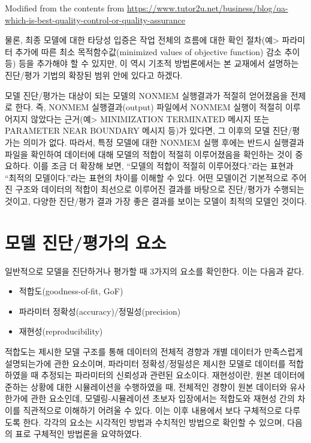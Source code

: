 \documentclass[
  10pt,
]{krantz}
\begin{document}
Modified from the contents from
\url{https://www.tutor2u.net/business/blog/qa-which-is-best-quality-control-or-quality-assurance}

물론, 최종 모델에 대한 타당성 입증은 작업 전체의 흐름에 대한 확인 절차(예\textgreater{} 파라미터 추가에 따른 최소
목적함수값(minimized values of objective function) 감소 추이 등) 등을 추가해야
할 수 있지만, 이 역시 기초적 방법론에서는 본 교재에서 설명하는 진단/평가 기법의 확장된 범위 안에 있다고 하겠다.

모델 진단/평가는 대상이 되는 모델의 NONMEM 실행결과가 적절히 얻어졌음을 전제로 한다. 즉, NONMEM
실행결과(output) 파일에서 NONMEM 실행이 적절히 이루어지지 않았다는 근거(예\textgreater{} MINIMIZATION
TERMINATED 메시지 또는 PARAMETER NEAR BOUNDARY 메시지 등)가 있다면, 그 이후의 모델 진단/평가는
의미가 없다. 따라서, 특정 모델에 대한 NONMEM 실행 후에는 반드시 실행결과 파일을 확인하여 데이터에 대해 모델의
적합이 적절히 이루어졌음을 확인하는 것이 중요하다. 이를 조금 더 확장해 보면, ``모델의 적합이 적절히 이루어졌다.''라는
표현과 ``최적의 모델이다.''라는 표현의 차이를 이해할 수 있다. 어떤 모델이건 기본적으로 주어진 구조와 데이터의 적합이
최선으로 이루어진 결과를 바탕으로 진단/평가가 수행되는 것이고, 다양한 진단/평가 결과 가장 좋은 결과를 보이는
모델이 최적의 모델인 것이다.

\hypertarget{uxbaa8uxb378-uxc9c4uxb2e8uxd3c9uxac00uxc758-uxc694uxc18c}{%
\section{모델 진단/평가의 요소}\label{uxbaa8uxb378-uxc9c4uxb2e8uxd3c9uxac00uxc758-uxc694uxc18c}}

일반적으로 모델을 진단하거나 평가할 때 3가지의 요소를 확인한다. 이는 다음과 같다.

\begin{itemize}
\item
  적합도(goodness-of-fit, GoF)
\item
  파라미터 정확성(accuracy)/정밀성(precision)
\item
  재현성(reproducibility)
\end{itemize}

적합도는 제시한 모델 구조를 통해 데이터의 전체적 경향과 개별 데이터가 만족스럽게 설명되는가에 관한 요소이며, 파라미터
정확성/정밀성은 제시한 모델로 데이터를 적합하였을 때 추정되는 파라미터의 신뢰성과 관련된 요소이다. 재현성이란,
원본 데이터에 준하는 상황에 대한 시뮬레이션을 수행하였을 때, 전체적인 경향이 원본 데이터와 유사한가에 관한 요소인데,
모델링-시뮬레이션 초보자 입장에서는 적합도와 재현성 간의 차이를 직관적으로 이해하기 어려울 수 있다. 이는 이후
내용에서 보다 구체적으로 다루도록 한다. 각각의 요소는 시각적인 방법과 수치적인 방법으로 확인할 수 있으며, 다음의 표로 구체적인
방법론을 요약하였다.
\end{document}
